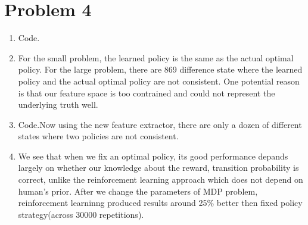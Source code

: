 \documentclass[12pt]{article}
\begin{document}
\section*{Problem 4}
\begin{enumerate}[label=(\alph*)]
\item Code.
\item For the small problem, the learned policy is the same as the actual
optimal policy. For the large problem, there are 869 difference state where the
learned policy and the actual optimal policy are not consistent. One potential
reason is that our feature space is too contrained and could not represent  the underlying truth well.
\item Code.Now using the new feature extractor, there are only a dozen of
different states where two policies are not consistent. 
\item We see that when we fix an optimal policy, its good performance depands
largely on whether our knowledge about the reward, transition probability is
correct, unlike the reinforcement learning approach which does not depend on
human's prior. After we change the parameters of MDP problem, reinforcement
learninng produced results around 25\% better then fixed policy strategy(across
30000 repetitions).
\end{enumerate}
\end{document}
